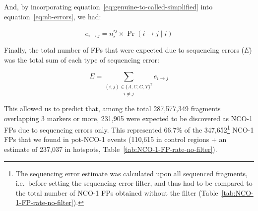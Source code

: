 And, by incorporating equation~\ref{eq:genuine-to-called-simplified} into equation~\ref{eq:nb-errors}, we had:

\begin{equation*} \label{eq:nb-errors-with-only-known-parameters}
	e_{i\rightarrow j} = n_{i}^{ij} \times \Pr( i\rightarrow j \mid i )
\end{equation*}


Finally, the total number of FPs that were expected due to sequencing errors ($E$) was the total sum of each type of sequencing error: 

\begin{equation*} \label{eq:sum-all-NCOs-expected}
	E = \underset{i \neq j} {\sum_{(i, j) \in \{A, C, G, T\}^2}} e_{i\rightarrow j}
\end{equation*}




This allowed us to predict that, among the total 287,577,349 fragments overlapping 3 markers or more, 231,905 were expected to be discovered as NCO-1 FPs due to sequencing errors only.
This represented 66.7\% of the 347,652\footnote{The sequencing error estimate was calculated upon all sequenced fragments, i.e.\ before setting the sequencing error filter, and thus had to be compared to the total number of NCO-1 FPs obtained without the filter (Table~\ref{tab:NCO-1-FP-rate-no-filter}).} NCO-1 FPs that we found in pot-NCO-1 events (110,615 in control regions + an estimate of 237,037 in hotspots, Table~\ref{tab:NCO-1-FP-rate-no-filter}).


